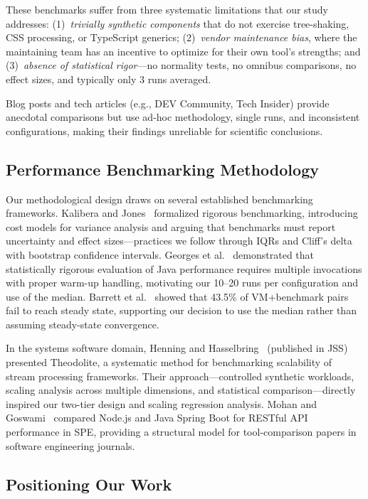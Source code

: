 \documentclass[preprint,12pt]{elsarticle}
\begin{document}
These benchmarks suffer from three systematic limitations that our study addresses:
(1)~\emph{trivially synthetic components} that do not exercise tree-shaking, CSS processing, or TypeScript generics;
(2)~\emph{vendor maintenance bias}, where the maintaining team has an incentive to optimize for their own tool's strengths;
and (3)~\emph{absence of statistical rigor}---no normality tests, no omnibus comparisons, no effect sizes, and typically only 3 runs averaged.

Blog posts and tech articles (e.g., DEV Community, Tech Insider) provide anecdotal comparisons but use ad-hoc methodology, single runs, and inconsistent configurations, making their findings unreliable for scientific conclusions.

\subsection{Performance Benchmarking Methodology}

Our methodological design draws on several established benchmarking frameworks.
Kalibera and Jones~\cite{kalibera2013rigorous} formalized rigorous benchmarking, introducing cost models for variance analysis and arguing that benchmarks must report uncertainty and effect sizes---practices we follow through IQRs and Cliff's delta with bootstrap confidence intervals.
Georges et al.~\cite{georges2007statistically} demonstrated that statistically rigorous evaluation of Java performance requires multiple invocations with proper warm-up handling, motivating our 10--20 runs per configuration and use of the median.
Barrett et al.~\cite{barrett2017vm} showed that 43.5\% of VM+benchmark pairs fail to reach steady state, supporting our decision to use the median rather than assuming steady-state convergence.

In the systems software domain, Henning and Hasselbring~\cite{henning2024benchmarking} (published in JSS) presented Theodolite, a systematic method for benchmarking scalability of stream processing frameworks.
Their approach---controlled synthetic workloads, scaling analysis across multiple dimensions, and statistical comparison---directly inspired our two-tier design and scaling regression analysis.
Mohan and Goswami~\cite{mohan2025nodejs} compared Node.js and Java Spring Boot for RESTful API performance in SPE, providing a structural model for tool-comparison papers in software engineering journals.

\subsection{Positioning Our Work}
\end{document}
